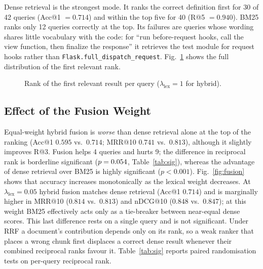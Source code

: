 \documentclass[conference]{IEEEtran}
\begin{document}
Dense retrieval is the strongest mode. It ranks the correct definition first
for 30 of 42 queries (Acc@1 $=0.714$) and within the top five for 40 (R@5
$=0.940$). BM25 ranks only 12 queries correctly at the top. Its failures are
queries whose wording shares little vocabulary with the code: for ``run
before-request hooks, call the view function, then finalize the response'' it
retrieves the test module for request hooks rather than
\texttt{Flask.full\_dispatch\_request}. Fig.~\ref{fig:ranks} shows the full
distribution of the first relevant rank.

\begin{figure}[t]
\centering
{}
\caption{Rank of the first relevant result per query ($\lambda_{\text{lex}}=1$ for hybrid).}
\label{fig:ranks}
\end{figure}

\subsection{Effect of the Fusion Weight}
Equal-weight hybrid fusion is \emph{worse} than dense retrieval alone at the top
of the ranking (Acc@1 $0.595$ vs.\ $0.714$; MRR@10 $0.741$ vs.\ $0.813$),
although it slightly improves R@3. Fusion helps 4 queries and hurts 9; the
difference in reciprocal rank is borderline significant ($p = 0.054$,
Table~\ref{tab:sig}), whereas the advantage of dense retrieval over BM25 is
highly significant ($p < 0.001$). Fig.~\ref{fig:fusion} shows that accuracy
increases monotonically as the lexical weight decreases. At
$\lambda_{\text{lex}} = 0.05$ hybrid fusion matches dense retrieval (Acc@1
$0.714$) and is marginally higher in MRR@10 ($0.814$ vs.\ $0.813$) and
nDCG@10 ($0.848$ vs.\ $0.847$); at this weight BM25 effectively acts only as a
tie-breaker between near-equal dense scores. This last difference rests on a
single query and is not significant. Under RRF a document's
contribution depends only on its rank, so a weak ranker that places a wrong
chunk first displaces a correct dense result whenever their combined
reciprocal ranks favour it. Table~\ref{tab:sig} reports paired randomisation
tests on per-query reciprocal rank.
\end{document}
